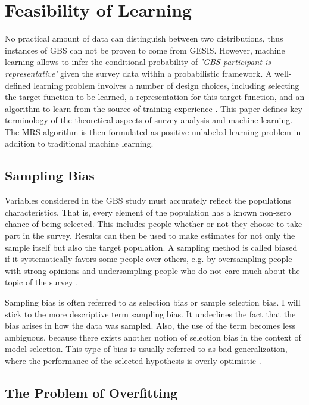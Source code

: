 \chapter{Feasibility of Learning}\label{Sec:Feasibility of Learning}

No practical amount of data can distinguish between two distributions, thus instances of GBS can not be proven to come from GESIS. However, machine learning allows to infer the conditional probability of \textit{'GBS participant is representative'} given the survey data within a probabilistic framework. A well-defined learning problem involves a number of design choices, including selecting the target function to be learned, a representation for this target function, and an algorithm to learn from the source of training experience \cite{tom}. This paper defines key terminology of the theoretical aspects of survey analysis and machine learning. The MRS algorithm is then formulated as positive-unlabeled learning problem in addition to traditional machine learning.

\section{Sampling Bias}

Variables considered in the GBS study must accurately reflect the populations characteristics. That is, every element of the population has a known non-zero chance of being selected. This includes people whether or not they choose to take part in the survey. Results can then be used to make estimates for not only the sample itself but also the target population. A sampling method is called biased if it systematically favors some people over others, e.g. by oversampling people with strong opinions and undersampling people who do not care much about the topic of the survey \cite{west}.

Sampling bias is often referred to as selection bias or sample selection bias. I will stick to the more descriptive term sampling bias. It underlines the fact that the bias arises in how the data was sampled. Also, the use of the term becomes less ambiguous, because there exists another notion of selection bias in the context of model selection. This type of bias is usually referred to as bad generalization, where the performance of the selected hypothesis is overly optimistic \cite{yaser}.

\section{The Problem of Overfitting}


